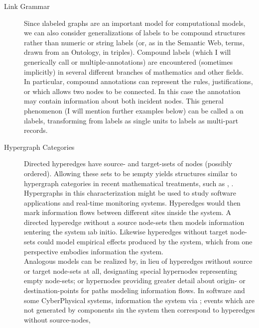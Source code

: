 {\begin{description}
\item[Link Grammar]   Since \i{labeled} 
graphs are an important model for computational models, 
we can also consider generalizations of labels to be 
compound structures rather than numeric or string labels 
(or, as in the Semantic Web,  terms,  
drawn from an Ontology, in  
triples).  Compound labels (which I will generically call 
 or multiple-annotations) are encountered (sometimes implicitly) 
in several different branches of mathematics and other fields.  
\vspace*{.3em}\\\hspace*{3em}
In particular, compound annotations can represent the 
rules, justifications, or  which allows 
two nodes to be connected.   In this case the annotation 
may contain information about both incident nodes.  
This general phenomenon (I will mention further examples 
below) can be called a  
on \i{labels}, transforming from labels as single units 
to labels as multi-part records.
\item[Hypergraph Categories]  Directed hyperedges have source- 
and target-\i{sets} of nodes (possibly ordered).  Allowing 
these sets to be \i{empty} yields structures similar to 
hypergraph categories in recent mathematical treatments, such 
as \cite{BrendanFong}, \cite{AleksKissinger}.  Hypergraphs 
in this characterization might be used to study software applications 
and real-time monitoring systems.  Hyperedges would then 
mark information flows between different sites \i{inside} the 
system.  A directed hyperedge \i{without} a source node-sets then 
models information \i{entering} the system \i{ab initio}.  
Likewise hyperedges without target node-sets could model 
empirical effects produced by the system, which from one 
perspective embodies information  the system.
\vspace*{.3em}\\\hspace*{3em}
Analogous models can be realized by, in lieu of 
hyperedges \i{without} source or target node-sets at all, 
designating special hypernodes representing empty 
node-sets; or hypernodes providing greater detail about 
origin- or destination-points for paths modeling 
information flows.  In software and some CyberPhysical 
systems, information  the system via 
; events which are not generated by components \i{in} the 
system then correspond to hyperedges without source-nodes, 

\end{description}}
